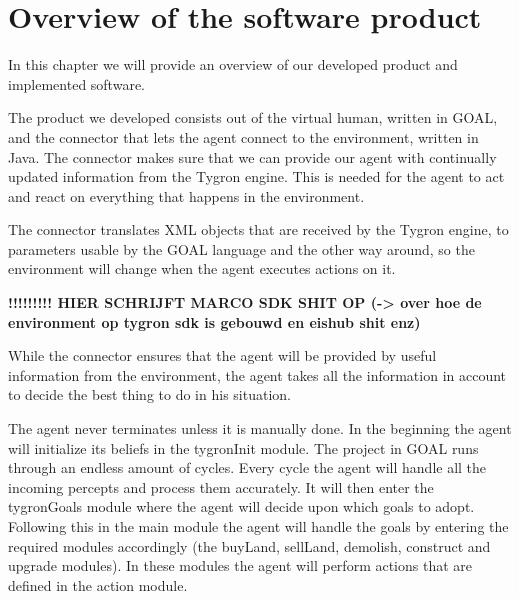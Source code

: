 \chapter{Overview of the software product}
In this chapter we will provide an overview of our developed product and implemented software.

The product we developed consists out of the virtual human, written in GOAL, and the connector that lets the agent connect to the environment, written in Java. The connector makes sure that we can provide our agent with continually updated information from the Tygron engine. This is needed for the agent to act and react on everything that happens in the environment.

The connector translates XML objects that are received by the Tygron engine, to parameters usable by the GOAL language and the other way around, so the environment will change when the agent executes actions on it.

\textbf{!!!!!!!!! HIER SCHRIJFT MARCO SDK SHIT OP (-> over hoe de environment op tygron sdk is gebouwd en eishub shit enz)}

While the connector ensures that the agent will be provided by useful information from the environment, the agent takes all the information in account to decide the best thing to do in his situation. 

The agent never terminates unless it is manually done. In the beginning the agent will initialize its beliefs in the tygronInit module. The project in GOAL runs through an endless amount of cycles. Every cycle the agent will handle all the incoming percepts and process them accurately. It will then enter the tygronGoals module where the agent will decide upon which goals to adopt. Following this in the main module the agent will handle the goals by entering the required modules accordingly (the buyLand, sellLand, demolish, construct and upgrade modules). In these modules the agent will perform actions that are defined in the action module.
\newpage
